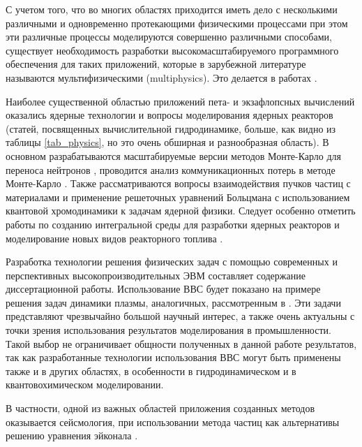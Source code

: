 С учетом того, что во многих областях приходится иметь дело с несколькими различными и одновременно протекающими физическими процессами при этом эти различные процессы моделируются совершенно различными способами, существует необходимость разработки высокомасштабируемого программного обеспечения для таких приложений, которые в зарубежной литературе называются мультифизическими (multiphysics). Это делается в работах \cite{Yamamoto2014576,Agullo201196,Ettrich20151,Vazquez2016,
	Liu2011261,Zheng2015313}.

Наиболее существенной областью приложений пета- и экзафлопсных вычислений оказались ядерные технологии и вопросы моделирования ядерных реакторов (статей, посвященных вычислительной гидродинамике, больше, как видно из таблицы \ref{tab_physics}, но это очень обширная и разнообразная область). В основном разрабатываются масштабируемые версии методов Монте-Карло для переноса нейтронов \cite{Romano2013274,Romano201320,Romano201590,Boyd201443,Gong2012588,Gong20116010,Bergmann2015176,Bauge201432}, проводится анализ коммуникационных потерь в методе Монте-Карло \cite{Siegel20123119,Horelik2014646,Tramm2016}. Также рассматриваются вопросы взаимодействия пучков частиц с материалами \cite{Bandura20103485} и применение решеточных уравнений Больцмана с использованием квантовой хромодинамики к задачам ядерной физики\cite{Beane20111,Savage2012140}.
Следует особенно отметить работы по созданию интегральной среды для разработки ядерных реакторов \cite{Patterson201697} и моделирование новых видов реакторного топлива \cite{Stan200920}.

Разработка технологии решения физических задач с помощью современных и перспективных высокопроизводительных ЭВМ составляет содержание диссертационной работы. Использование ВВС будет показано на примере решения задач динамики плазмы, аналогичных, рассмотренным в \cite{BretPoP2010,BirdsallIEEE,LangdonBirdsall}. Эти задачи представляют чрезвычайно большой научный интерес, а также очень актуальны с точки зрения использования результатов моделирования в промышленности. Такой выбор не ограничивает общности полученных в данной работе результатов, так как разработанные технологии использования ВВС могут быть применены также и в других областях, в особенности в гидродинамическом и в квантовохимическом моделировании.

В частности, одной из важных областей приложения созданных методов оказывается сейсмология, при использовании метода частиц
\cite{hockney,VshivkovPICbook} как альтернативы решению уравнения эйконала \cite{Engquist}.

